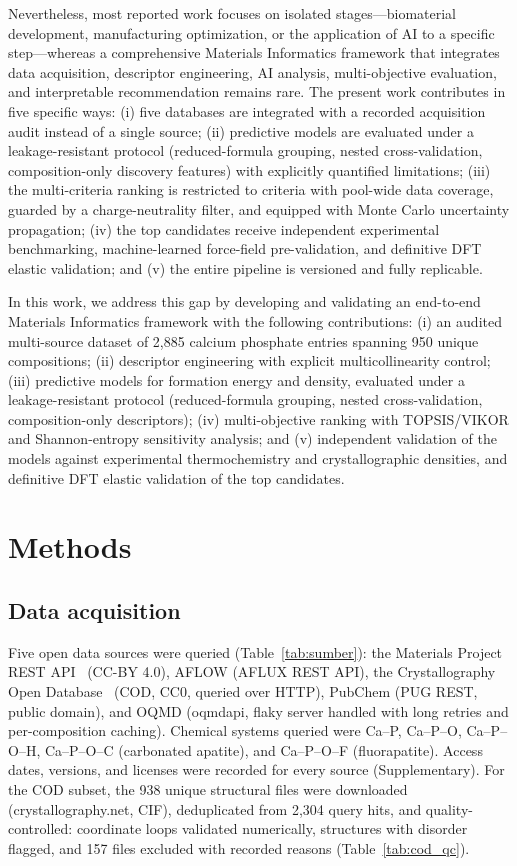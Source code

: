 \documentclass[review,11pt,a4paper]{elsarticle}
\begin{document}
Nevertheless, most reported work focuses on isolated stages---biomaterial development, manufacturing optimization, or the application of AI to a specific step---whereas a comprehensive Materials Informatics framework that integrates data acquisition, descriptor engineering, AI analysis, multi-objective evaluation, and interpretable recommendation remains rare. The present work contributes in five specific ways: (i) five databases are integrated with a recorded acquisition audit instead of a single source; (ii) predictive models are evaluated under a leakage-resistant protocol (reduced-formula grouping, nested cross-validation, composition-only discovery features) with explicitly quantified limitations; (iii) the multi-criteria ranking is restricted to criteria with pool-wide data coverage, guarded by a charge-neutrality filter, and equipped with Monte Carlo uncertainty propagation; (iv) the top candidates receive independent experimental benchmarking, machine-learned force-field pre-validation, and definitive DFT elastic validation; and (v) the entire pipeline is versioned and fully replicable.

In this work, we address this gap by developing and validating an end-to-end Materials Informatics framework with the following contributions: (i) an audited multi-source dataset of 2{,}885 calcium phosphate entries spanning 950 unique compositions; (ii) descriptor engineering with explicit multicollinearity control; (iii) predictive models for formation energy and density, evaluated under a leakage-resistant protocol (reduced-formula grouping, nested cross-validation, composition-only descriptors); (iv) multi-objective ranking with TOPSIS/VIKOR and Shannon-entropy sensitivity analysis; and (v) independent validation of the models against experimental thermochemistry and crystallographic densities, and definitive DFT elastic validation of the top candidates.

\section{Methods}

\subsection{Data acquisition}
Five open data sources were queried (Table~\ref{tab:sumber}): the Materials Project REST API~\cite{jain2013} (CC-BY 4.0), AFLOW (AFLUX REST API), the Crystallography Open Database~\cite{grazulis2009} (COD, CC0, queried over HTTP), PubChem (PUG REST, public domain), and OQMD (oqmdapi, flaky server handled with long retries and per-composition caching). Chemical systems queried were Ca--P, Ca--P--O, Ca--P--O--H, Ca--P--O--C (carbonated apatite), and Ca--P--O--F (fluorapatite). Access dates, versions, and licenses were recorded for every source (Supplementary). For the COD subset, the 938 unique structural files were downloaded (crystallography.net, CIF), deduplicated from 2{,}304 query hits, and quality-controlled: coordinate loops validated numerically, structures with disorder flagged, and 157 files excluded with recorded reasons (Table~\ref{tab:cod_qc}).
\end{document}
